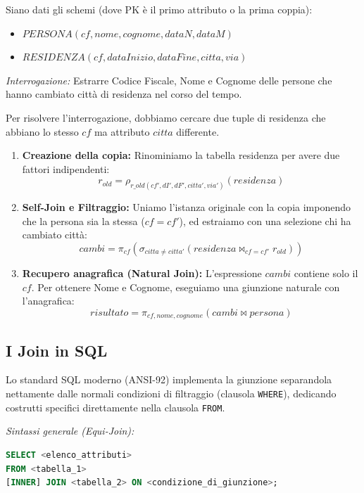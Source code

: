 \begin{example}
    Siano dati gli schemi (dove PK è il primo attributo o la prima coppia):
    \begin{itemize}
        \item $PERSONA(cf, nome, cognome, dataN, dataM)$
        \item $RESIDENZA(cf, dataInizio, dataFine, citta, via)$
    \end{itemize}
    \textit{Interrogazione:} Estrarre Codice Fiscale, Nome e Cognome delle persone che hanno cambiato città di residenza nel corso del tempo.
    
    Per risolvere l'interrogazione, dobbiamo cercare due tuple di residenza che abbiano lo stesso $cf$ ma attributo $citta$ differente. 
    \begin{enumerate}
        \item \textbf{Creazione della copia:} Rinominiamo la tabella residenza per avere due fattori indipendenti: 
        $$ r_{old} = \rho_{r\_old(cf', dI', dF', citta', via')}(residenza) $$
        \item \textbf{Self-Join e Filtraggio:} Uniamo l'istanza originale con la copia imponendo che la persona sia la stessa ($cf = cf'$), ed estraiamo con una selezione chi ha cambiato città:
        $$ cambi = \pi_{cf}(\sigma_{citta \neq citta'}(residenza \bowtie_{cf = cf'} r_{old})) $$
        \item \textbf{Recupero anagrafica (Natural Join):} L'espressione $cambi$ contiene solo il $cf$. Per ottenere Nome e Cognome, eseguiamo una giunzione naturale con l'anagrafica:
        $$ risultato = \pi_{cf, nome, cognome}(cambi \bowtie persona) $$
    \end{enumerate}
\end{example}

\subsection{I Join in SQL}

Lo standard SQL moderno (ANSI-92) implementa la giunzione separandola nettamente dalle normali condizioni di filtraggio (clausola \texttt{WHERE}), dedicando costrutti specifici direttamente nella clausola \texttt{FROM}.

\textit{Sintassi generale (Equi-Join):}
\begin{lstlisting}[language=SQL, basicstyle=\ttfamily\small, keywordstyle=\color{blue}\bfseries]
SELECT <elenco_attributi>
FROM <tabella_1>
[INNER] JOIN <tabella_2> ON <condizione_di_giunzione>;
\end{lstlisting}

